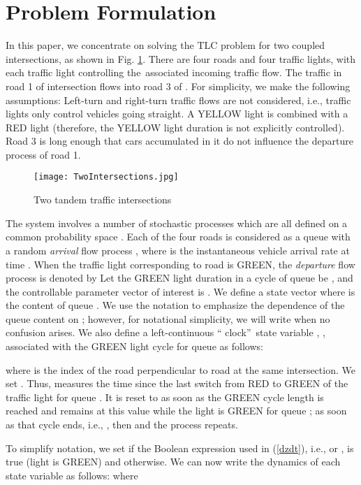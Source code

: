 \documentclass{ifacconf}\usepackage{graphicx}
\begin{document}
\section{Problem Formulation}

In this paper, we concentrate on solving the TLC problem for two coupled
intersections, as shown in Fig. \ref{junction}. There are four roads and four
traffic lights, with each traffic light controlling the\ associated incoming
traffic flow. The traffic in road 1 of intersection  flows into road 3
of . For simplicity, we make the following assumptions:  Left-turn
and right-turn traffic flows are not considered, i.e., traffic lights only
control vehicles going straight.  A YELLOW light is combined with a RED
light (therefore, the YELLOW light duration is not explicitly controlled).
 Road 3 is long enough that cars accumulated in it do not influence the
departure process of road 1.

\begin{figure}[tbh]
\centering
\texttt{[image: TwoIntersections.jpg]} \caption{Two tandem
traffic intersections}\label{junction}\end{figure}

The system involves a number of stochastic processes which are all defined on
a common probability space . Each of the four roads is
considered as a queue with a random \emph{arrival} flow process , where  is the instantaneous vehicle
arrival rate at time . When the traffic light corresponding to road  is
GREEN, the \emph{departure} flow process is denoted by  Let the GREEN light duration in a cycle of queue  be
, and the controllable parameter vector of interest is
. We define a state vector
 where  is the content of queue . We use the notation
 to emphasize the dependence of the queue content on ; however, for notational simplicity, we will write  when no
confusion arises. We also define a left-continuous \textquotedblleft
clock\textquotedblright\ state variable , , associated
with the GREEN light cycle for queue  as follows:

where  is the index of the road perpendicular to road  at the same
intersection. We set . Thus,  measures
the time since the last switch from RED to GREEN of the traffic light for
queue . It is reset to  as soon as the GREEN cycle length 
is reached and remains at this value while the light is GREEN for queue
; as soon as that cycle ends, i.e., , then  and the process repeats.

To simplify notation, we set  if the Boolean expression
used in (\ref{dzdt}), i.e.,  or , is true (light is GREEN) and 
otherwise. We can now write the dynamics of each state variable  as
follows:
where
\end{document}
